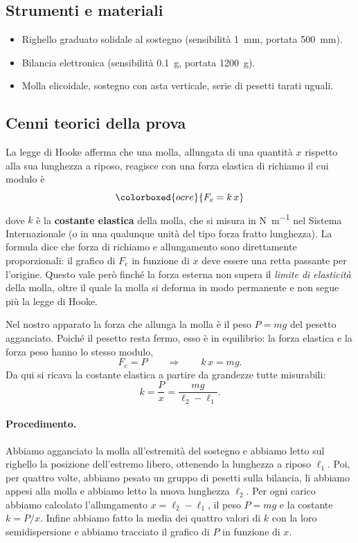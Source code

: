 \subsection{Strumenti e materiali}
\begin{itemize}
    \item Righello graduato solidale al sostegno (sensibilità \SI{1}{\milli\metre}, portata \SI{500}{\milli\metre}).
    \item Bilancia elettronica (sensibilità \SI{0,1}{\gram}, portata \SI{1200}{\gram}).
    \item Molla elicoidale, sostegno con asta verticale, serie di pesetti tarati uguali.
\end{itemize}

\subsection{Cenni teorici della prova}
La legge di Hooke afferma che una molla, allungata di una quantità $x$ rispetto alla sua lunghezza a riposo, reagisce con una forza elastica di richiamo il cui modulo è
\[ \colorboxed{ocre}{ F_e = k\,x } \]
dove $k$ è la \textbf{costante elastica} della molla, che si misura in \si{\newton\per\metre} nel Sistema Internazionale (o in una qualunque unità del tipo forza fratto lunghezza). La formula dice che forza di richiamo e allungamento sono direttamente proporzionali: il grafico di $F_e$ in funzione di $x$ deve essere una retta passante per l'origine. Questo vale però finché la forza esterna non supera il \emph{limite di elasticità} della molla, oltre il quale la molla si deforma in modo permanente e non segue più la legge di Hooke.

Nel nostro apparato la forza che allunga la molla è il peso $P=mg$ del pesetto agganciato. Poiché il pesetto resta fermo, esso è in equilibrio: la forza elastica e la forza peso hanno lo stesso modulo,
\[ F_e = P \qquad\Longrightarrow\qquad k\,x = m g . \]
Da qui si ricava la costante elastica a partire da grandezze tutte misurabili:
\[ k = \frac{P}{x} = \frac{m g}{\ell_2-\ell_1}. \]

\paragraph{Procedimento.} Abbiamo agganciato la molla all'estremità del sostegno e abbiamo letto sul righello la posizione dell'estremo libero, ottenendo la lunghezza a riposo $\ell_1$. Poi, per quattro volte, abbiamo pesato un gruppo di pesetti sulla bilancia, li abbiamo appesi alla molla e abbiamo letto la nuova lunghezza $\ell_2$. Per ogni carico abbiamo calcolato l'allungamento $x=\ell_2-\ell_1$, il peso $P=mg$ e la costante $k=P/x$. Infine abbiamo fatto la media dei quattro valori di $k$ con la loro semidispersione e abbiamo tracciato il grafico di $P$ in funzione di $x$.


